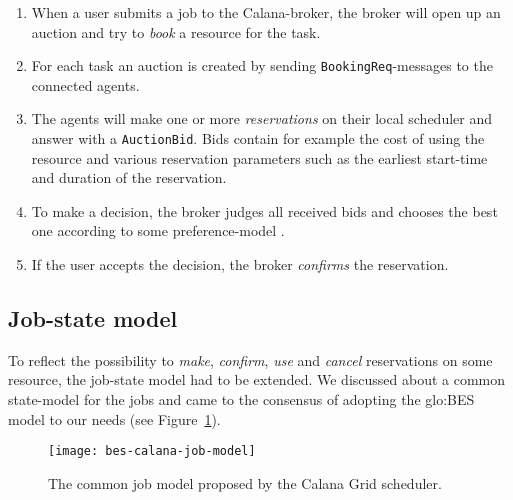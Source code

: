 \begin{enumerate}
\item When a user submits a job to the Calana-broker, the broker will open
  up an auction and try to \emph{book} a resource for the task.
\item    For   each   task    an   auction    is   created    by   sending
  \texttt{BookingReq}-messages to the connected agents.
\item The agents will make  one or more \emph{reservations} on their local
  scheduler  and  answer with  a  \texttt{AuctionBid}.   Bids contain  for
  example  the  cost  of   using  the  resource  and  various  reservation
  parameters  such  as  the   earliest  start-time  and  duration  of  the
  reservation.
\item To make a decision, the  broker judges all received bids and chooses
  the     best     one      according     to     some     preference-model
  \cite{dalheimer05agentbased, petry06}.
\item If  the user  accepts the decision,  the broker  \emph{confirms} the
  reservation.
\end{enumerate}

\subsection{Job-state model}
\label{app:sec:calana-job-model}

To reflect the possibility  to \emph{make}, \emph{confirm}, \emph{use} and
\emph{cancel} reservations on some resource, the job-state model had to be
extended. We discussed about a common state-model for the jobs and came to
the  consensus of  adopting  the  \gls{glo:BES} model  to  our needs  (see
Figure~\ref{fig:bes-calana-job-model}).

\begin{figure}[h]
  \centering
  \texttt{[image: bes-calana-job-model]}
  \caption[Calana Job Model]{The common job model proposed by the Calana
    Grid scheduler.}
  \label{fig:bes-calana-job-model}
\end{figure}

